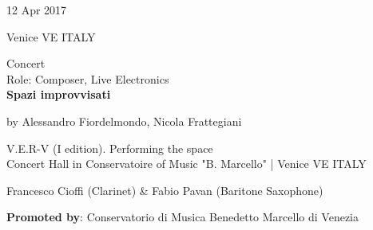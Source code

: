 \documentclass[7pt,a4paper]{article}
\begin{document}
\begin{mdframed}[
    backgroundcolor=entrygray,
    linecolor=entrygray,
    linewidth=0pt,
    innerleftmargin=6pt,
    innerrightmargin=6pt,
    innertopmargin=6pt,
    innerbottommargin=6pt,
    skipabove=0pt,
    skipbelow=0pt
]

\begin{minipage}[t]{0.28\textwidth}

12 Apr 2017

\scriptsize Venice VE ITALY


\end{minipage}
\begin{minipage}[t]{0.68\textwidth}
\small Concert
\\\scriptsize Role: Composer, Live Electronics
\\ \normalsize \textbf{Spazi improvvisati}
\par\scriptsize by Alessandro Fiordelmondo, Nicola Frattegiani

\vspace{0.25cm}



\small V.E.R-V (I edition). Performing the space\\Concert Hall in Conservatoire of Music "B. Marcello" | \scriptsize Venice VE ITALY

\vspace{0.1cm}
\scriptsize

Francesco Cioffi (Clarinet) \& Fabio Pavan (Baritone Saxophone)

\vspace{0.1cm}
\par \textbf{Promoted by}: Conservatorio di Musica Benedetto Marcello di Venezia
\end{minipage}
\vspace{0.25cm}
\end{mdframed}
\end{document}

